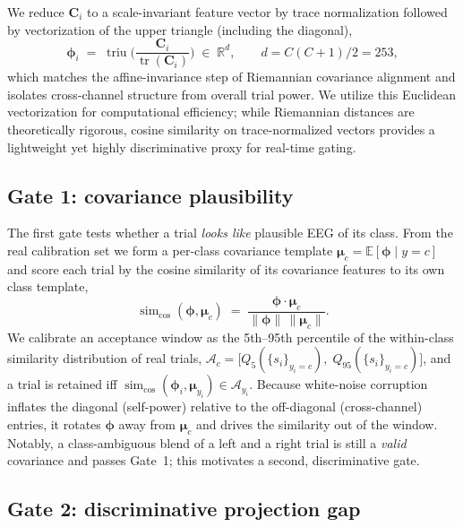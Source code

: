 \documentclass[conference]{IEEEtran}
\newcommand{\R}{\mathbb{R}}
\newcommand{\triu}{\operatorname{triu}}
\newcommand{\simcos}{\operatorname{sim}_{\mathrm{cos}}}
\newcommand{\tr}{\operatorname{tr}}
\begin{document}
We reduce $\mathbf{C}_i$ to a scale-invariant feature vector by trace
normalization followed by vectorization of the upper triangle (including the
diagonal),
\begin{equation}
  \boldsymbol{\phi}_i \;=\; \triu\!\Big(\frac{\mathbf{C}_i}{\tr(\mathbf{C}_i)}\Big)
  \;\in\;\R^{d},
  \qquad d = C(C+1)/2 = 253,
  \label{eq:feat}
\end{equation}
which matches the affine-invariance step of Riemannian covariance alignment and
isolates cross-channel structure from overall trial power. We utilize this
Euclidean vectorization for computational efficiency; while Riemannian distances
are theoretically rigorous, cosine similarity on trace-normalized vectors
provides a lightweight yet highly discriminative proxy for real-time gating.

\subsection{Gate 1: covariance plausibility}
\label{sec:gate1}

The first gate tests whether a trial \emph{looks like} plausible EEG of its
class. From the real calibration set we form a per-class covariance template
$\boldsymbol{\mu}_c = \mathbb{E}[\boldsymbol{\phi}\mid y=c]$ and score each
trial by the cosine similarity of its covariance features to its own class
template,
\begin{equation}
  \simcos(\boldsymbol{\phi}, \boldsymbol{\mu}_c)
  \;=\;
  \frac{\boldsymbol{\phi}\cdot\boldsymbol{\mu}_c}
       {\lVert\boldsymbol{\phi}\rVert\,\lVert\boldsymbol{\mu}_c\rVert}.
  \label{eq:cosine}
\end{equation}
We calibrate an acceptance window as the 5th--95th percentile of the
within-class similarity distribution of real trials,
$\mathcal{A}_c=\big[Q_5(\{s_i\}_{y_i=c}),\;Q_{95}(\{s_i\}_{y_i=c})\big]$, and a
trial is retained iff $\simcos(\boldsymbol{\phi}_i,\boldsymbol{\mu}_{y_i})\in
\mathcal{A}_{y_i}$. Because white-noise corruption inflates the diagonal
(self-power) relative to the off-diagonal (cross-channel) entries, it rotates
$\boldsymbol{\phi}$ away from $\boldsymbol{\mu}_c$ and drives the similarity out
of the window. Notably, a class-ambiguous blend of a left and a right
trial is still a \emph{valid} covariance and passes Gate~1; this motivates a
second, discriminative gate.

\subsection{Gate 2: discriminative projection gap}
\label{sec:gate2}
\end{document}
